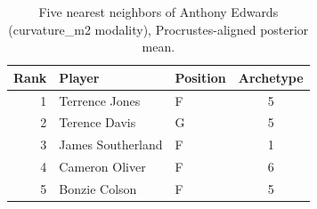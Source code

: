 \begin{table}[htbp]
  \centering\small
  \begin{tabular}{rllc}
    \toprule
    Rank & Player & Position & Archetype \\
    \midrule
    1 & Terrence Jones & F & 5 \\
    2 & Terence Davis & G & 5 \\
    3 & James Southerland & F & 1 \\
    4 & Cameron Oliver & F & 6 \\
    5 & Bonzie Colson & F & 5 \\
    \bottomrule
  \end{tabular}
  \caption{Five nearest neighbors of Anthony Edwards (curvature_m2 modality), Procrustes-aligned posterior mean.}
  \label{tab:Anthony_Edwards_neighbors_curvature_m2}
\end{table}

